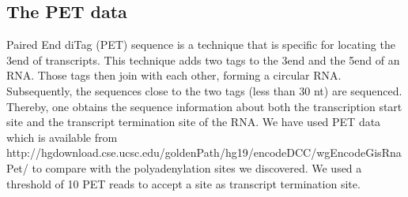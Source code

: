 \subsection{The PET data}
Paired End diTag (PET) sequence is a technique that is specific for locating
the 3\p end of transcripts. This technique adds two tags to the 3\p end and the
5\p end of an RNA. Those tags then join with each other, forming a circular
RNA. Subsequently, the sequences close to the two tags (less than 30 nt) are
sequenced. Thereby, one obtains the sequence information about both the
transcription start site and the transcript termination site of the RNA. We
have used PET data which is available from
http://hgdownload.cse.ucsc.edu/goldenPath/hg19/encodeDCC/wgEncodeGisRnaPet/ to
compare with the polyadenylation sites we discovered. We used a threshold of 10
PET reads to accept a site as transcript termination site.
